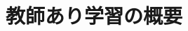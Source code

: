 \documentclass[../../topic_machine-learning]{subfiles}
\begin{document}
\chapter{教師あり学習の概要}


\end{document}
